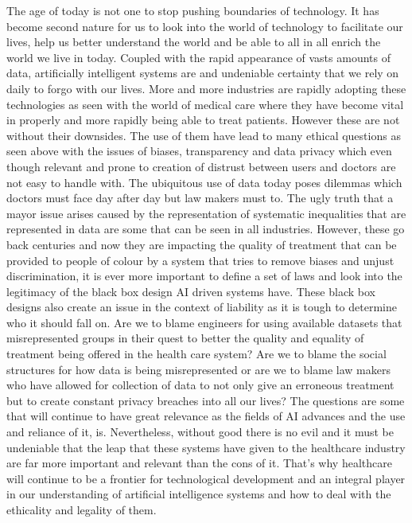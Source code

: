 \documentclass[a4paper,12pt,oneside]{report}
\begin{document}
The age of today is not one to stop pushing boundaries of technology. It has become second nature for us to look into the world of technology to facilitate our lives, help us better understand the world and be able to all in all enrich the world we live in today. Coupled with the rapid appearance of vasts amounts of data, artificially intelligent systems are and undeniable certainty that we rely on daily to forgo with our lives. More and more industries are rapidly adopting these technologies as seen with the world of medical care where they have become vital in properly and more rapidly being able to treat patients. However these are not without their downsides. The use of them have lead to many ethical questions as seen above with the issues of biases, transparency and data privacy which even though relevant and prone to creation of distrust between users and doctors are not easy to handle with. The ubiquitous use of data today poses dilemmas which doctors must face day after day but law makers must to. The ugly truth that a mayor issue arises caused by the representation of systematic inequalities that are represented in data are some that can be seen in all industries. However, these go back centuries and now they are impacting the quality of treatment that can be provided to people of colour by a system that tries to remove biases and unjust discrimination, it is ever more important to define a set of laws and look into the legitimacy of the black box design AI driven systems have. These black box designs also create an issue in the context of liability as it is tough to determine who it should fall on. Are we to blame engineers for using available datasets that misrepresented groups in their quest to better the quality and equality of treatment being offered in the health care system? Are we to blame the social structures for how data is being misrepresented or are we to blame law makers who have allowed for collection of data to not only give an erroneous treatment but to create constant privacy breaches into all our lives? The questions are some that will continue to have great relevance as the fields of AI advances and the use and reliance of it, is. Nevertheless, without good there is no evil and it must be undeniable that the leap that these systems have given to the healthcare industry are far more important and relevant than the cons of it. That's why healthcare will continue to be a frontier for technological development and an integral player in our understanding of artificial intelligence systems and how to deal with the ethicality and legality of them.
\end{document}

